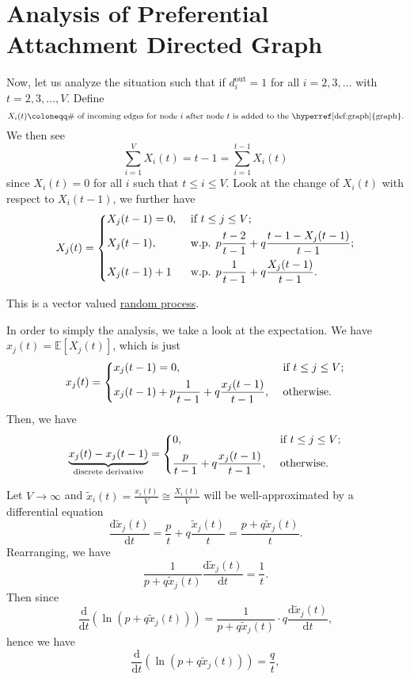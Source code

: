 \section{Analysis of Preferential Attachment Directed Graph}
Now, let us analyze the situation such that if \(d_{i}^{\text{out}} = 1\) for all \(i = 2, 3, \ldots \) with \(t = 2, 3, \ldots , V\). Define
\[
	X_i(t)\coloneqq \#\text{ of incoming edges for node \(i\) after node \(t\) is added to the \hyperref[def:graph]{graph}}.
\]
We then see
\[
	\sum\limits_{i=1}^{V} X_i(t) = t - 1 = \sum\limits_{i=1}^{t - 1} X_{i}(t)
\]
since \(X_i(t) = 0\) for all \(i\) such that \(t\leq i\leq V\). Look at the change of \(X_{i}(t)\) with respect to \(X_i(t - 1)\), we further have
\[
	X_{j}(t) = \begin{dcases}
		X_{j}(t - 1) = 0, & \text{ if }t\leq j\leq V;                                                 \\
		X_{j}(t - 1),     & \text{ w.p. } p \frac{t - 2}{t - 1}+q \frac{t - 1 - X_{j}(t - 1)}{t - 1}; \\
		X_{j}(t - 1)+1    & \text{ w.p. } p \frac{1}{t - 1} + q \frac{X_{j}(t - 1)}{t - 1}.           \\
	\end{dcases}
\]

\begin{remark}
	This is a vector valued \hyperref[def:stochastic-process]{random process}.
\end{remark}

In order to simply the analysis, we take a look at the expectation. We have \(x_{j}(t) = \mathbb{E}\left[X_{j}(t) \right] \), which is just
\[
	x_{j}(t) = \begin{dcases}
		x_{j}(t - 1) = 0,                                                & \text{ if }t\leq j\leq V; \\
		x_{j}(t - 1) + p \frac{1}{t - 1} + q \frac{x_{j}(t - 1)}{t - 1}, & \text{ otherwise}.
	\end{dcases}
\]
Then, we have
\[
	\underbrace{x_{j}(t) - x_{j}(t - 1)}_{\text{discrete derivative}} = \begin{dcases}
		0,                                              & \text{ if }t\leq j\leq V; \\
		\frac{p}{t - 1} + q \frac{x_{j}(t - 1)}{t - 1}, & \text{ otherwise}.
	\end{dcases}
\]

Let \(V\to \infty \) and \(\widetilde{x}_i(t) = \frac{x_{i}(t)}{V}\cong \frac{X_{i}(t)}{V}\) will be well-approximated by a differential equation
\[
	\frac{\mathrm{d}\widetilde{x}_j(t)}{\mathrm{d}t} = \frac{p}{t} + q \frac{\widetilde{x}_j(t)}{t} = \frac{p + q \widetilde{x}_j(t)}{t}.
\]
Rearranging, we have
\[
	\frac{1}{p+q \widetilde{x}_j(t)}\frac{\mathrm{d}\widetilde{x}_j(t)}{\mathrm{d}t} = \frac{1}{t}.
\]
Then since
\[
	\frac{\mathrm{d}}{\mathrm{d}t}\left(\ln(p + q \widetilde{x}_j(t))\right) = \frac{1}{p + q \widetilde{x}_j(t)}\cdot q \frac{\mathrm{d}\widetilde{x}_j(t)}{\mathrm{d}t},
\]
hence we have
\[
	\frac{\mathrm{d}}{\mathrm{d}t}\left(\ln(p + q \widetilde{x}_j(t))\right) = \frac{q}{t},
\]

